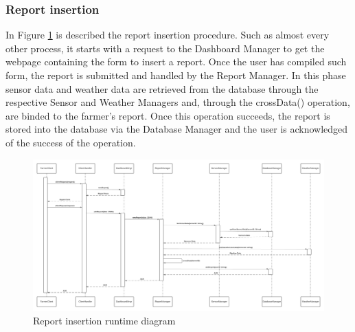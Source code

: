 \documentclass[10pt]{article} %
\begin{document}
\subsubsection{Report insertion}
In Figure \ref{fig:r_report} is described the report insertion procedure. Such as almost every other process, it starts with a request to the Dashboard Manager to get
the webpage containing the form to insert a report. Once the user has compiled such form, the report is submitted and handled by the Report Manager. In this phase sensor data 
and weather data are retrieved from the database through the respective Sensor and Weather Managers and, through the crossData() operation, are binded to the farmer's report.
Once this operation succeeds, the report is stored into the database via the Database Manager and the user is acknowledged of the success of the operation.
\begin{figure}[h]
    \centering
    \centerline{\includegraphics[scale=0.41]{images/rv/insertReport.png}}
    \caption{Report insertion runtime diagram}
    \label{fig:r_report}
\end{figure}
\newpage
\end{document}
